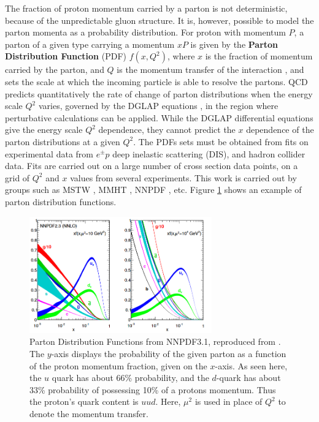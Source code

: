 \documentclass[11pt,a4paper,openright,twoside]{report}
\begin{document}
The fraction of proton momentum carried by a parton is not deterministic, because of the unpredictable gluon structure. It is, however, possible to model the parton momenta as a probability distribution. For proton with momentum $P$, a parton  of a given type carrying a momentum $xP$ is given by the \textbf{Parton Distribution Function} (PDF) $f(x,Q^2)$, where $x$ is the fraction of momentum carried by the parton, and $Q$ is the momentum transfer of the interaction \cite{collider_physics}, and sets the scale at which the incoming particle is able to resolve the partons. QCD predicts quantitatively the rate of change of parton distributions when the energy scale $Q^2$ varies, governed by the DGLAP equations \cite{DGLAP}, in the region where perturbative calculations can be applied. While the DGLAP differential equations give the energy scale $Q^2$ dependence, they cannot predict the $x$ dependence of the parton distributions at a given $Q^2$. The PDFs sets must be obtained from fits on experimental data from $e^\pm p$ deep inelastic scattering (DIS), and hadron collider data. Fits are carried out on a large number of cross section data points, on a grid of $Q^2$ and $x$ values from several experiments. This work is carried out by groups such as  MSTW \cite{MSTW, MSTW2, MSTW3}, MMHT \cite{MMHT14}, NNPDF \cite{NNPDF}, etc. Figure \ref{fig:NNPDF3} shows an example of parton distribution functions.

\begin{figure}[h]
\centering
\includegraphics[width=0.7\textwidth]{NNPDF3.png}
\caption{Parton Distribution Functions from NNPDF3.1, reproduced from \cite{NNPDF}. The $y$-axis displays the probability of the given parton as a function of the proton momentum fraction, given on the $x$-axis. As seen here, the $u$ quark has about 66\% probability, and the $d$-quark has about 33\% probability of possessing 10\% of a protons momentum. Thus the proton's quark content is $uud$. Here, $\mu^2$ is used in place of $Q^2$ to denote the momentum transfer.}
\label{fig:NNPDF3}
\end{figure}
\end{document}
